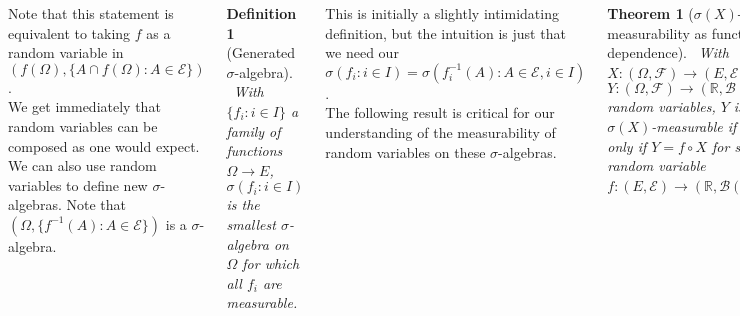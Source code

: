 \documentclass{tikzposter} %
\newtheorem{theorem}{Theorem}
\newtheorem{definition}{Definition}
\begin{document}
\begin{columns}
{    Note that this statement is equivalent to taking $f$ as a random variable in $(f(\Omega), \{A \cap f(\Omega) : A \in \mathcal{E}\})$. \\

    We get immediately that random variables can be composed as one would expect. We can also use random variables to define new $\sigma$-algebras. Note that $(\Omega, \{f^{-1}(A) : A \in \mathcal{E}\})$ is a $\sigma$-algebra. \\

    \begin{definition}[Generated $\sigma$-algebra]
    \ With $\{f_{i} : i \in I\}$ a family of functions $\Omega \to E$, $\sigma(f_{i} : i \in I)$ is the smallest $\sigma$-algebra on $\Omega$ for which all $f_{i}$ are measurable.
    \end{definition}
    \hphantom{}

    This is initially a slightly intimidating definition, but the intuition is just that we need our $\sigma(f_{i} : i \in I) = \sigma(f_{i}^{-1}(A) : A \in \mathcal{E}, i \in I)$. \\

    The following result is critical for our understanding of the measurability of random variables on these $\sigma$-algebras. \\

    \begin{theorem}[$\sigma(X)$-measurability as functional dependence]
    \ With $X : (\Omega, \mathcal{F}) \to (E, \mathcal{E})$, $Y : (\Omega, \mathcal{F}) \to (\mathbb{R}, \mathcal{B}(\mathbb{R}))$ random variables, $Y$ is $\sigma(X)$-measurable if and only if $Y = f \circ X$ for some random variable $f : (E, \mathcal{E}) \to (\mathbb{R}, \mathcal{B}(\mathbb{R}))$.
    \end{theorem}
    \hphantom{}

    To construct this we use a standard method of beginning with simple functions, and then using the density of $\mathcal{E}$-simple functions in $\mathcal{E}$-measurable functions under the pointwise topology, we can construct $f$ in general. \\

    Noting that if $X_{1},\dots,X_{n}$ are measurable on $(\Omega,\mathcal{F})$, $(X_{1},\dots,X_{n})$ is also measurable (start with showing the measurability property on the normal $\pi$-system generating $\mathcal{B}(\mathbb{R}^{n})$, then use $\pi$-$\lambda$ systems lemma), this statement generalises much further than this, to include sequences of random variables as well. \\

}
\end{columns}
\end{document}
